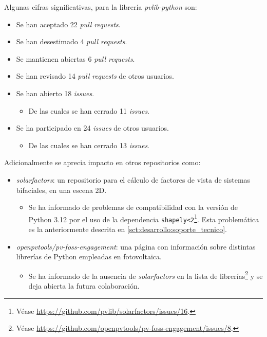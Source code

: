 Algunas cifras significativas, para la librería \textit{pvlib-python} son:

\begin{itemize}
    \item Se han aceptado 22 \textit{pull requests}.
    \item Se han desestimado 4 \textit{pull requests}.
    \item Se mantienen abiertas 6 \textit{pull requests}.
    \item Se han revisado 14 \textit{pull requests} de otros usuarios.
    \item Se han abierto 18 \textit{issues}.
    \begin{itemize}
        \item De las cuales se han cerrado 11 \textit{issues}.
    \end{itemize}
    \item Se ha participado en 24 \textit{issues} de otros usuarios.
    \begin{itemize}
        \item De las cuales se han cerrado 13 \textit{issues}.
    \end{itemize}
\end{itemize}

Adicionalmente se aprecia impacto en otros repositorios como:

\begin{itemize}
    \item \textit{solarfactors}: un repositorio para el cálculo de factores de vista de sistemas bifaciales, en una escena 2D.
    \begin{itemize}
        \item Se ha informado de problemas de compatibilidad con la versión de Python 3.12 por el uso de la dependencia \texttt{shapely<2}\footnote{Véase \url{https://github.com/pvlib/solarfactors/issues/16}.}. Esta problemática es la anteriormente descrita en \ref{sct:desarrollo:soporte_tecnico}.
    \end{itemize}
    \item \textit{openpvtools/pv-foss-engagement}: una página con información sobre distintas librerías de Python empleadas en fotovoltaica.
    \begin{itemize}
        \item Se ha informado de la ausencia de \textit{solarfactors} en la lista de librerías\footnote{Véase \url{https://github.com/openpvtools/pv-foss-engagement/issues/8}.} y se deja abierta la futura colaboración.
    \end{itemize}
\end{itemize}


